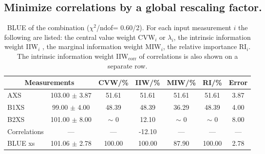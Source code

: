 \clearpage
\subsection{Minimize correlations by a global rescaling factor.}
\begin{table}[H]
\scriptsize
\begin{center}
\renewcommand{\arraystretch}{1.1}
\begin{tabular}{|lc|c|c|c|c|c|}
\hline
\multicolumn{2}{|c|}{Measurements} & CVW/\%  & IIW/\%  & MIW/\%  & RI/\%  & {\tiny Error}\\
\hline
AXS &     103.00 $\pm$       3.87 &      51.61 &      51.61 &      51.61 &      51.61 &       3.87\\
B1XS &      99.00 $\pm$       4.00 &      48.39 &      48.39 &      36.29 &      48.39 &       4.00\\
B2XS &     101.00 $\pm$       8.00 &  {\tiny $\sim$ }0 &      12.10 &  {\tiny $\sim$ }0 &  {\tiny $\sim$ }0 &       8.00\\
Correlations & --- & --- &     -12.10 & --- & --- & ---\\
\hline
BLUE {\tiny xs} &     101.06 $\pm$       2.78 &     100.00 &     100.00 &      87.90 &     100.00 &       2.78\\
\hline
\end{tabular}
\caption{BLUE of the combination ($\chi^2$/ndof=      0.60/2).
 For each input measurement $i$ the following are listed: the central value weight CVW$_i$ or $\lambda_i$, the intrinsic information weight IIW$_i$ , the marginal information weight MIW$_i$, the relative importance RI$_i$. The intrinsic information weight IIW$_{\mathrm{corr}}$ of correlations is also shown on a separate row.}
\renewcommand{\arraystretch}{1}
\end{center}
\end{table}
